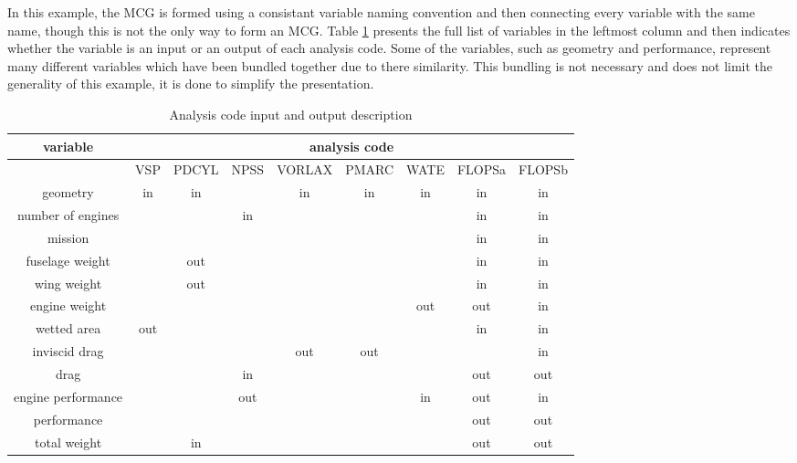 In this example, the MCG is formed using a consistant variable naming convention and then connecting every variable with the same name, though this is not the only way to form an MCG. 
Table \ref{t:ins and outs} presents the full list of variables in the leftmost column and then indicates whether the variable is an input or an output of each analysis code. 
Some of the variables, such as geometry and performance, represent many different variables which have been bundled together due to there similarity. 
This bundling is not necessary and does not limit the generality of this example, it is done to simplify the presentation.
\begin{table}[htb!]
  \centering
  \caption{Analysis code input and output description}
    \begin{tabular}{ccccccccc}
    \toprule
    variable & \multicolumn{8}{c}{analysis code} \\
    \midrule
          & VSP   & PDCYL & NPSS  & VORLAX & PMARC & WATE  & FLOPSa & FLOPSb \\
    geometry & in    & in    &       & in    & in    & in    & in    & in \\
    number of engines &       &       & in    &       &       &       & in    & in \\
    mission &       &       &       &       &       &       & in    & in \\
    fuselage weight &       & out   &       &       &       &       & in    & in \\
    wing weight &       & out   &       &       &       &       & in    & in \\
    engine weight &       &       &       &       &       & out   & out   & in \\
    wetted area & out   &       &       &       &       &       & in    & in \\
    inviscid drag &       &       &       & out   & out   &       &       & in \\
    drag  &       &       & in    &       &       &       & out   & out \\
    engine performance &       &       & out   &       &       & in    & out   & in \\
    performance &       &       &       &       &       &       & out   & out \\
    total weight &       & in    &       &       &       &       & out   & out \\
    \bottomrule
    \end{tabular}
  \label{t:ins and outs}
\end{table}

